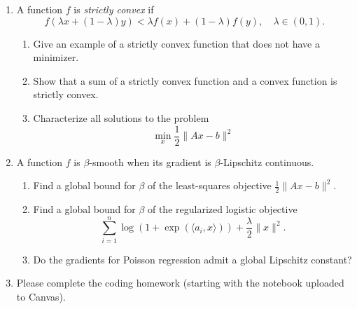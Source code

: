 \documentclass[11pt]{amsart}
\begin{document}
\begin{enumerate}
\bigskip\bigskip


\item A function $f$ is {\it strictly convex} if 
\[
f(\lambda x + (1-\lambda)y) < \lambda f(x) + (1-\lambda) f(y), \quad \lambda \in (0,1).
\]
\begin{enumerate}
\item Give an example of a strictly convex function that 
does not have a minimizer. 
\item Show that a sum of a strictly convex function and a convex function is strictly convex. 
\item Characterize all solutions to the problem 
   $$\min_x \frac{1}{2}\|Ax - b\|^2$$
\end{enumerate}
\bigskip\bigskip



\item A function $f$ is $\beta$-smooth when 
its gradient is $\beta$-Lipschitz continuous.   
\begin{enumerate}
\item Find a global bound for $\beta$ of the least-squares objective $\frac{1}{2}\|Ax-b\|^2$.
\item Find a global bound for $\beta$ of the regularized logistic objective 
\[
\sum_{i=1}^n \log(1+\exp(\langle a_i, x\rangle)) + \frac{\lambda}{2}\|x\|^2. 
\]
\item Do the gradients for Poisson regression admit a global Lipschitz constant? 
\end{enumerate}



\bigskip\bigskip

\item Please complete the coding homework (starting with the notebook uploaded to Canvas). 


\end{enumerate}
\end{document}
